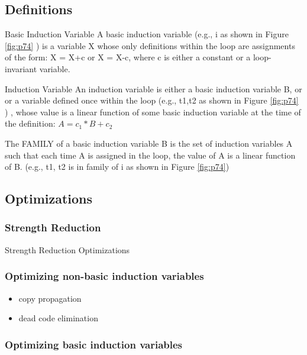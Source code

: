 \subsection{Definitions}

\begin{definition}{Basic Induction Variable}
    A basic induction variable (e.g., i as shown in Figure \ref{fig:p74} ) is a variable X whose only definitions within the loop
are assignments of the form: X = X+c or X = X-c, where c is either a constant or 
a loop-invariant variable. 
\end{definition}

\begin{definition}{Induction Variable}
    An induction variable is either a basic induction variable B, or
or a variable defined once within the loop (e.g., t1,t2 as shown in Figure \ref{fig:p74} ) , whose value is a linear function
of some basic induction variable at the time of the definition:
$A = c_1 * B + c_2$
\end{definition}

The FAMILY of a basic induction variable B is the set of induction variables A such that each time A is assigned in the loop,
the value of A is a linear function of B. (e.g., t1, t2 is in family of i as shown in Figure \ref{fig:p74})


\subsection{Optimizations}

\subsubsection{Strength Reduction}
\begin{algorithm}[H]
    \caption{Strength Reduction Optimizations}\label{alg:Strength Reduction Optimizations}
    \begin{algorithmic}


    \end{algorithmic}
    \end{algorithm}

\subsubsection{Optimizing non-basic induction variables}


\begin{itemize}
\item copy propagation
\item dead code elimination
\end{itemize}


\subsubsection{Optimizing basic induction variables}